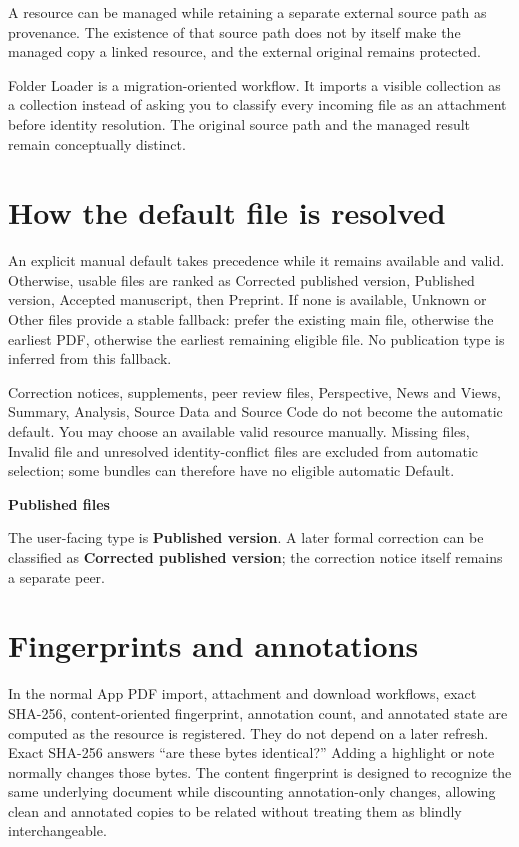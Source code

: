 \documentclass[10pt,letterpaper,oneside]{scrreprt}
\renewenvironment{quote}
  {\Needspace{5\baselineskip}\begin{tcolorbox}[enhanced,breakable,colback=GewuPale,colframe=GewuPale,boxrule=0pt,
    borderline west={1.6pt}{0pt}{GewuBlue},arc=1.2mm,left=2.5mm,right=2.5mm,top=1.7mm,bottom=1.7mm,
    before skip=4pt,after skip=5pt,fontupper=\color{GewuInk}\small]}
  {\end{tcolorbox}}
\begin{document}
A resource can be managed while retaining a separate external source path as provenance. The existence of that source path does not by itself make the managed copy a linked resource, and the external original remains protected.

Folder Loader is a migration-oriented workflow. It imports a visible collection as a collection instead of asking you to classify every incoming file as an attachment before identity resolution. The original source path and the managed result remain conceptually distinct.

\section{How the default file is resolved}\label{how-the-default-file-is-resolved}

An explicit manual default takes precedence while it remains available and valid. Otherwise, usable files are ranked as Corrected published version, Published version, Accepted manuscript, then Preprint. If none is available, Unknown or Other files provide a stable fallback: prefer the existing main file, otherwise the earliest PDF, otherwise the earliest remaining eligible file. No publication type is inferred from this fallback.

Correction notices, supplements, peer review files, Perspective, News and Views, Summary, Analysis, Source Data and Source Code do not become the automatic default. You may choose an available valid resource manually. Missing files, Invalid file and unresolved identity-conflict files are excluded from automatic selection; some bundles can therefore have no eligible automatic Default.

\begin{quote}
\textbf{Published files}

The user-facing type is \textbf{Published version}. A later formal correction can be classified as \textbf{Corrected published version}; the correction notice itself remains a separate peer.
\end{quote}

\section{Fingerprints and annotations}\label{fingerprints-and-annotations}

In the normal App PDF import, attachment and download workflows, exact SHA-256, content-oriented fingerprint, annotation count, and annotated state are computed as the resource is registered. They do not depend on a later refresh. Exact SHA-256 answers ``are these bytes identical?'' Adding a highlight or note normally changes those bytes. The content fingerprint is designed to recognize the same underlying document while discounting annotation-only changes, allowing clean and annotated copies to be related without treating them as blindly interchangeable.
\end{document}
